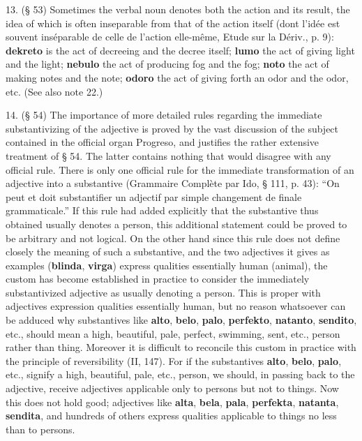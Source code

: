 13. (§ 53) Sometimes the verbal noun denotes both the action and its result, the idea of which is often inseparable from that of the action itself (dont l'idée est souvent inséparable de celle de l'action elle-même, Etude sur la Dériv., p. 9): \textbf{dekreto} is the act of decreeing and the decree itself; \textbf{lumo} the act of giving light and the light; \textbf{nebulo} the act of producing fog and the fog; \textbf{noto} the act of making notes and the note; \textbf{odoro} the act of giving forth an odor and the odor, etc. (See also note 22.)

14. (§ 54) The importance of more detailed rules regarding the immediate substantivizing of the adjective is proved by the vast discussion of the subject contained in the official organ Progreso, and justifies the rather extensive treatment of § 54. The latter contains nothing that would disagree with any official rule. There is only one official rule for the immediate transformation of an adjective into a substantive (Grammaire Complète par Ido, § 111, p. 43): ``On peut et doit substantifier un adjectif par simple changement de finale grammaticale.'' If this rule had added explicitly that the substantive thus obtained usually denotes a person, this additional statement could be proved to be arbitrary and not logical. On the other hand since this rule does not define closely the meaning of such a substantive, and the two adjectives it gives as examples (\textbf{blinda}, \textbf{virga}) express qualities essentially human (animal), the custom has become established in practice to consider the immediately substantivized adjective as usually denoting a person. This is proper with adjectives expression qualities essentially human, but no reason whatsoever can be adduced why substantives like \textbf{alto}, \textbf{belo}, \textbf{palo}, \textbf{perfekto}, \textbf{natanto}, \textbf{sendito}, etc., should mean a high, beautiful, pale, perfect, swimming, sent, etc., person rather than thing. Moreover it is difficult to reconcile this custom in practice with the principle of reversibility (II, 147). For if the substantives \textbf{alto}, \textbf{belo}, \textbf{palo}, etc., signify a high, beautiful, pale, etc., person, we should, in passing back to the adjective, receive adjectives applicable only to persons but not to things. Now this does not hold good; adjectives like \textbf{alta}, \textbf{bela}, \textbf{pala}, \textbf{perfekta}, \textbf{natanta}, \textbf{sendita}, and hundreds of others express qualities applicable to things no less than to persons.

